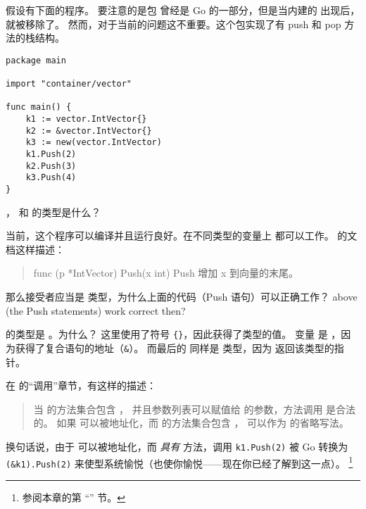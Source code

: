 \begin{Exercise}[title={方法调用},difficulty=8]
\label{ex:methodcalls}
\Question \label{ex:methodcalls q1} 假设有下面的程序。
要注意的是包  曾经是 Go 的一部分，但是当内建的
 出现后，就被移除了。
然而，对于当前的问题这不重要。这个包实现了有 push 和 pop 方法的栈结构。

\begin{lstlisting}
package main

import "container/vector"

func main() {
	k1 := vector.IntVector{}
	k2 := &vector.IntVector{}
	k3 := new(vector.IntVector)
	k1.Push(2)
	k2.Push(3)
	k3.Push(4)
}
\end{lstlisting}
， 和  的类型是什么？

\Question 当前，这个程序可以编译并且运行良好。在不同类型的变量上 
都可以工作。 的文档这样描述：
\begin{quote}
func (p *IntVector) Push(x int)
Push 增加 x 到向量的末尾。
\end{quote}
那么接受者应当是  类型，为什么上面的代码（Push 语句）可以正确工作？
above (the Push statements) work correct then?

\end{Exercise}

\begin{Answer}
\Question {} 的类型是 。为什么？
这里使用了符号 \verb|{}|，因此获得了类型的值。
变量  是 ，因为获得了复合语句的地址（\verb|&|）。
而最后的  同样是  类型，因为 
返回该类型的指针。

\Question 在 \cite{go_spec} 的``调用''章节，有这样的描述：
\begin{quote}
当  的方法集合包含 ，
并且参数列表可以赋值给  的参数，方法调用  是合法的。
如果  可以被地址化，而  的方法集合包含 ，
 可以作为  的省略写法。
\end{quote}
换句话说，由于  可以被地址化，而 
\emph{具有}  方法，调用 \lstinline{k1.Push(2)} 被 Go 转换为 
\lstinline{(&k1).Push(2)} 来使型系统愉悦（也使你愉悦——现在你已经了解到这一点）。
\footnote{参阅本章的第 ``'' 节。}

\end{Answer}

